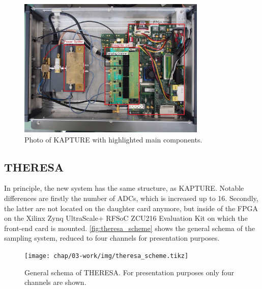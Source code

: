 \begin{figure}[H]
	\centering
	\includegraphics[width = 0.8\textwidth]{chap/03-work/img/kapture_sys.png}
	\caption{Photo of KAPTURE with highlighted main components. \cite[p.~61]{brosi}}
	\label{fig:kapture}
\end{figure}

\newpage
\subsection{THERESA}
In principle, the new system has the same structure, as KAPTURE. Notable differences are firstly the number of ADCs, which is increased up to 16. Secondly, the latter are not located on the daughter card anymore, but inside of the FPGA on the Xilinx Zynq UltraScale+ RFSoC ZCU216 Evaluation Kit on which the front-end card is mounted. \autoref{fig:theresa_scheme} shows the general schema of the sampling system, reduced to four channels for presentation purposes.
\begin{figure}[H]
	\centering
	\texttt{[image: chap/03-work/img/theresa\_scheme.tikz]}
	\caption{General schema of THERESA. For presentation purposes only four channels are shown.}
	\label{fig:theresa_scheme}
\end{figure}

